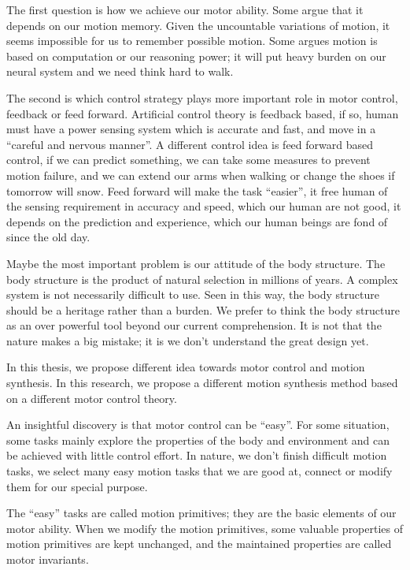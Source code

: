 \begin{itemize}
The first question is how we achieve our motor ability. Some argue that it depends on our motion memory. Given the uncountable variations of motion, it seems impossible for us to remember possible motion. Some argues motion is based on computation or our reasoning power; it will put heavy burden on our neural system and we need think hard to walk.
	
The second is which control strategy plays more important role in motor control, feedback or feed forward. Artificial control theory is feedback based, if so, human must have a power sensing system which is accurate and fast, and move in a “careful and nervous manner”. 
A different control idea is feed forward based control, if we can predict something, we can take some measures to prevent motion failure, and we can extend our arms when walking or change the shoes if tomorrow will snow.
Feed forward will make the task “easier”, it free human of the sensing requirement in accuracy and speed, which our human are not good, it depends on the prediction and experience, which our human beings are fond of since the old day.
	
Maybe the most important problem is our attitude of the body structure. The body structure is the product of natural selection in millions of years. A complex system is not necessarily difficult to use. Seen in this way, the body structure should be a heritage rather than a burden.  We prefer to think the body structure as an over powerful tool beyond our current comprehension. 
It is not that the nature makes a big mistake; it is we don’t understand the great design yet.

\end{itemize}


In this thesis, we propose different idea towards motor control and motion synthesis.
In this research, we propose a different motion synthesis method based on a different motor control theory.

An insightful discovery is that motor control can be “easy”.
For some situation, some tasks mainly explore the properties of the body and environment and can be achieved with little control effort.
In nature, we don’t finish difficult motion tasks, we select many easy motion tasks that we are good at, connect or modify them for our special purpose.

The “easy” tasks are called motion primitives; they are the basic elements of our motor ability. 
When we modify the motion primitives, some valuable properties of motion primitives are kept unchanged, and the maintained properties are called motor invariants.

